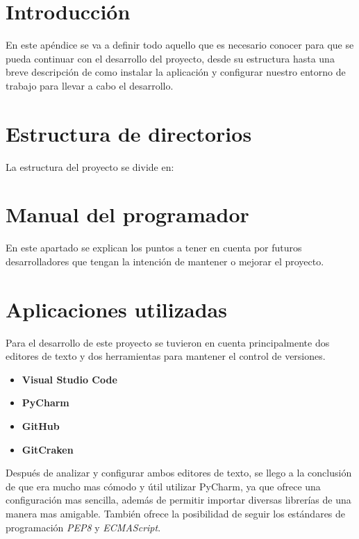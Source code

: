 

\section{Introducción}
En este apéndice se va a definir todo aquello que es necesario conocer para que se pueda continuar con el desarrollo del proyecto, desde su estructura hasta una breve descripción de como instalar la aplicación y configurar nuestro entorno de trabajo para llevar a cabo el desarrollo.

\section{Estructura de directorios}
La estructura del proyecto se divide en:

\section{Manual del programador}
En este apartado se explican los puntos a tener en cuenta por futuros desarrolladores que tengan la intención de mantener o mejorar el proyecto.

\section{Aplicaciones utilizadas}
Para el desarrollo de este proyecto se tuvieron en cuenta principalmente dos editores de texto y dos herramientas para mantener el control de versiones.

\begin{itemize}
	\item \textbf{Visual Studio Code} 
	\item \textbf{PyCharm}
	\item \textbf{GitHub}
	\item \textbf{GitCraken}
\end{itemize}
Después de analizar y configurar ambos editores de texto, se llego a la conclusión de que era mucho mas cómodo y útil utilizar PyCharm, ya que ofrece una configuración mas sencilla, además de permitir importar diversas librerías de una manera mas amigable. También ofrece la posibilidad de seguir los estándares de programación \textit{PEP8} y \textit{ECMAScript}.

